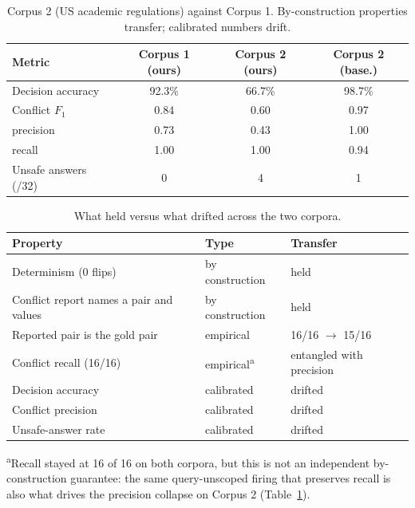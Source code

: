 \documentclass[conference]{IEEEtran}
\begin{document}
\begin{table}[htbp]
\caption{Corpus 2 (US academic regulations) against Corpus 1. By-construction
properties transfer; calibrated numbers drift.}
\label{tab:corpus2}
\centering
\small
\begin{tabularx}{\columnwidth}{@{}X c c c@{}}
\toprule
Metric & Corpus 1 (ours) & Corpus 2 (ours) & Corpus 2 (base.) \\
\midrule
Decision accuracy       & 92.3\% & 66.7\% & 98.7\% \\
Conflict $F_1$          & 0.84   & 0.60   & 0.97 \\
\quad precision         & 0.73   & 0.43            & 1.00 \\
\quad recall            & 1.00   & 1.00            & 0.94 \\
Unsafe answers (/32)    & 0      & 4      & 1 \\
\bottomrule
\end{tabularx}
\end{table}

\begin{table}[htbp]
\caption{What held versus what drifted across the two corpora.}
\label{tab:heldvsdrifted}
\centering
\small
\begin{tabularx}{\columnwidth}{@{}X l l@{}}
\toprule
Property & Type & Transfer \\
\midrule
Determinism (0 flips)          & by construction & held \\
Conflict report names a pair and values & by construction & held \\
Reported pair is the gold pair & empirical & 16/16 $\to$ 15/16 \\
Conflict recall (16/16)        & empirical\textsuperscript{a} & entangled with precision \\
Decision accuracy              & calibrated      & drifted \\
Conflict precision             & calibrated      & drifted \\
Unsafe-answer rate             & calibrated      & drifted \\
\bottomrule
\end{tabularx}

\vspace{3pt}
\raggedright\scriptsize
\textsuperscript{a}Recall stayed at 16 of 16 on both corpora, but this is
not an independent by-construction guarantee: the same query-unscoped
firing that preserves recall is also what drives the precision collapse on
Corpus 2 (Table~\ref{tab:corpus2}).
\end{table}
\end{document}
